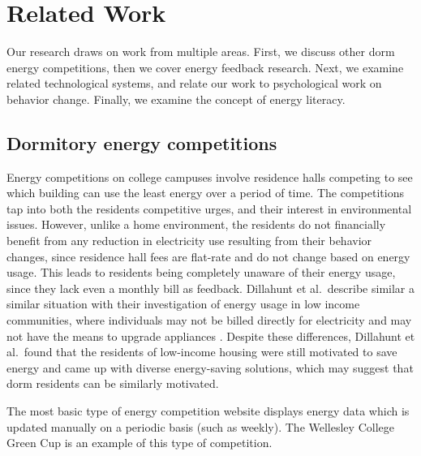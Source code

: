 
\section{Related Work}
\label{sec:related-work}

Our research draws on work from multiple areas. First, we discuss other dorm energy competitions, then we cover energy feedback research. Next, we examine related technological systems, and relate our work to psychological work on behavior change. Finally, we examine the concept of energy literacy.

\subsection{Dormitory energy competitions}

Energy competitions on college campuses involve residence halls competing to see which building can use the least energy over a period of time. The competitions tap into both the residents competitive urges, and their interest in environmental issues. However, unlike a home environment, the residents do not financially benefit from any reduction in electricity use resulting from their behavior changes, since residence hall fees are flat-rate and do not change based on energy usage. This leads to residents being completely unaware of their energy usage, since they lack even a monthly bill as feedback. Dillahunt et al.\ describe similar a similar situation with their investigation of energy usage in low income communities, where individuals may not be billed directly for electricity and may not have the means to upgrade appliances \cite{Dillahunt2009-low-income}. Despite these differences, Dillahunt et al.\ found that the residents of low-income housing were still motivated to save energy and came up with diverse energy-saving solutions, which may suggest that dorm residents can be similarly motivated.

The most basic type of energy competition website displays energy data which is updated manually on a periodic basis (such as weekly). The Wellesley College Green Cup \cite{wellesley-green-cup} is an example of this type of competition. 

